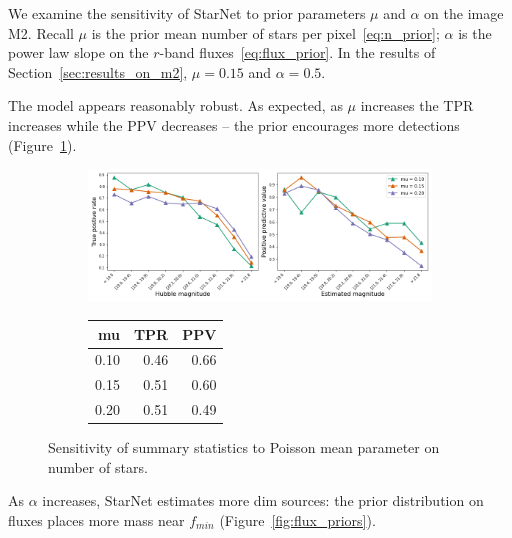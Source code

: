 We examine the sensitivity of StarNet to prior parameters $\mu$ and $\alpha$ on the image M2. 
Recall $\mu$ is the prior mean number of stars per pixel~\eqref{eq:n_prior};
$\alpha$ is the power law slope on the $r$-band fluxes~\eqref{eq:flux_prior}. 
In the results of Section~\ref{sec:results_on_m2}, $\mu=0.15$ and  $\alpha = 0.5$. 

The model appears reasonably robust. 
As expected, as $\mu$ increases the TPR increases while the PPV decreases  -- the prior encourages more detections (Figure~\ref{fig:mu_sensitivity}). 

\begin{figure}[ht]
\begin{subfigure}{\textwidth}
\centering
\includegraphics[width = \textwidth]{figures/prior_sensitivity/prior_mu_sensitivty.png}
\end{subfigure}
\begin{subfigure}{\textwidth}
\begin{center}
\begin{tabular}{rrr}
\toprule
     mu &   TPR &   PPV \\
\midrule
 0.10 &  0.46 &  0.66 \\
 0.15 &  0.51 &  0.60 \\
 0.20 &  0.51 &  0.49 \\
\bottomrule
\end{tabular}
\par\vspace{0pt}
\end{center}
\end{subfigure}\hfill
\caption{Sensitivity of summary statistics to Poisson mean parameter on number of stars. }
\label{fig:mu_sensitivity}
\end{figure}

As $\alpha$ increases, StarNet estimates more dim sources: the prior distribution on fluxes places more mass near $f_{min}$ (Figure~\ref{fig:flux_priors}). 

